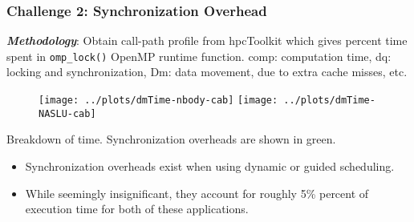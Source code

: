 \begin{frame}
\frametitle{Challenge 2: Synchronization Overhead}
{\tiny \textbf{\textit{Methodology}}: Obtain call-path profile from
  hpcToolkit which gives percent time spent in \texttt{omp\_lock()}
  OpenMP runtime function.}
{\tiny comp: computation time,  dq: locking and synchronization, 
Dm:  data movement, due to extra cache misses, etc. } 
\begin{figure}[t]
\label{fig:dmTimes-cab}
\begin{center}
\texttt{[image: ../plots/dmTime-nbody-cab]}
\texttt{[image: ../plots/dmTime-NASLU-cab]}
\end{center}
\end{figure}
\begin{center}
{\small Breakdown of time. Synchronization overheads are shown in green.}
\end{center}
\begin{itemize}
\tiny \item \tiny Synchronization overheads exist when using dynamic or guided scheduling.
\item \tiny While seemingly insignificant, they account for roughly 5\% percent of execution time for both of these applications. 
\end{itemize}
\end{frame}


